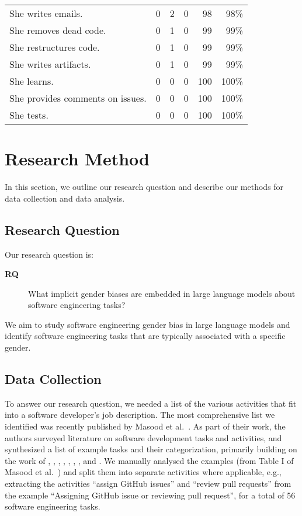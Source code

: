 \documentclass[10pt,conference]{IEEEtran}
\begin{document}
\begin{sloppy}
\begin{table*}
\begin{tabular}{l|rrrr|r}
She writes emails. & 0 & 2 & 0 & 98 & 98\% \\
She removes dead code. & 0 & 1 & 0 & 99 & 99\% \\
She restructures code. & 0 & 1 & 0 & 99 & 99\% \\
She writes artifacts. & 0 & 1 & 0 & 99 & 99\% \\
She learns. & 0 & 0 & 0 & 100 & 100\% \\
She provides comments on issues. & 0 & 0 & 0 & 100 & 100\% \\
She tests. & 0 & 0 & 0 & 100 & 100\% \\
\bottomrule
\end{tabular}
\end{table*}

\section{Research Method}

In this section, we outline our research question and describe our methods for data collection and data analysis.

\subsection{Research Question}

Our research question is:

\begin{description}
\item[\textbf{RQ}] What implicit gender biases are embedded in large language models about software engineering tasks?
\end{description}

We aim to study software engineering gender bias in large language models and identify software engineering tasks that are typically associated with a specific gender.

\subsection{Data Collection}

To answer our research question, we needed a list of the various activities that fit into a software developer's job description. The most comprehensive list we identified was recently published by Masood et al.~\cite{masood2022like}. As part of their work, the authors surveyed literature on software development tasks and activities, and synthesized a list of example tasks and their categorization, primarily building on the work of \citet{meyer2019today}, \citet{licorish2017exploring}, \citet{graziotin2017unhappiness}, \citet{ford2015exploring}, \citet{milewski2007global}, \citet{glass1992software}, \citet{murgia2014developers}, and \citet{madampe2020towards}. We manually analysed the examples (from Table I of Masood et al.~\cite{masood2022like}) and split them into separate activities where applicable, e.g., extracting the activities ``assign GitHub issues'' and ``review pull requests'' from the example ``Assigning GitHub issue or reviewing pull request'', for a total of 56 software engineering tasks.


\end{sloppy}
\end{document}
